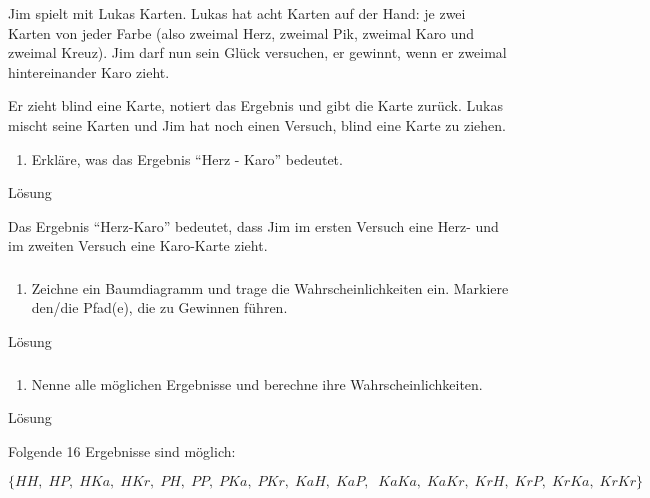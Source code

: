 \documentclass[
  ngerman,
]{book}
\providecommand{\tightlist}{%
  \setlength{\itemsep}{0pt}\setlength{\parskip}{0pt}}
\begin{document}
Jim spielt mit Lukas Karten. Lukas hat acht Karten auf der Hand: je zwei Karten von jeder Farbe (also zweimal Herz, zweimal Pik, zweimal Karo und zweimal Kreuz). Jim darf nun sein Glück versuchen, er gewinnt, wenn er zweimal hintereinander Karo zieht.

Er zieht blind eine Karte, notiert das Ergebnis und gibt die Karte zurück. Lukas mischt seine Karten und Jim hat noch einen Versuch, blind eine Karte zu ziehen.

\begin{enumerate}
\def\labelenumi{\alph{enumi})}
\tightlist
\item
  Erkläre, was das Ergebnis ``Herz - Karo'' bedeutet.
\end{enumerate}

Lösung

Das Ergebnis ``Herz-Karo'' bedeutet, dass Jim im ersten Versuch eine Herz- und im zweiten Versuch eine Karo-Karte zieht.

\hypertarget{section-115}{%
\subsubsection*{}\label{section-115}}

\begin{enumerate}
\def\labelenumi{\alph{enumi})}
\setcounter{enumi}{1}
\tightlist
\item
  Zeichne ein Baumdiagramm und trage die Wahrscheinlichkeiten ein. Markiere den/die Pfad(e), die zu Gewinnen führen.
\end{enumerate}

Lösung

\hypertarget{section-116}{%
\subsubsection*{}\label{section-116}}

\begin{enumerate}
\def\labelenumi{\alph{enumi})}
\setcounter{enumi}{2}
\tightlist
\item
  Nenne alle möglichen Ergebnisse und berechne ihre Wahrscheinlichkeiten.
\end{enumerate}

Lösung

Folgende 16 Ergebnisse sind möglich:

\(\{HH,\; HP,\; HKa,\;HKr,\;PH,\;PP,\;PKa,\;PKr,\;KaH,\;KaP,\;\;KaKa,\;KaKr,\;KrH,\;KrP,\;KrKa,\;KrKr\}\)
\end{document}
